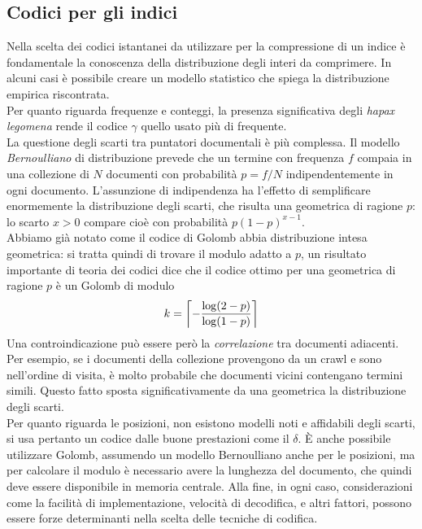 \subsection{Codici per gli indici}
Nella scelta dei codici istantanei da utilizzare per la compressione di un indice è fondamentale la conoscenza della distribuzione degli interi da comprimere. In alcuni casi è possibile creare un modello statistico che spiega la distribuzione empirica riscontrata.\\
Per quanto riguarda frequenze e conteggi, la presenza significativa degli \textit{hapax legomena} rende il codice $\gamma$ quello usato più di frequente.\\
La questione degli scarti tra puntatori documentali è più complessa. Il modello \textit{Bernoulliano} di distribuzione prevede che un termine con frequenza $f$ compaia in una collezione di $N$ documenti con probabilità $p = f / N$ indipendentemente in ogni documento. L'assunzione di indipendenza ha l'effetto di semplificare enormemente la distribuzione degli scarti, che risulta una geometrica di ragione $p$: lo scarto $x > 0$ compare cioè con probabilità $p(1 - p)^{x - 1}$.\\
Abbiamo già notato come il codice di Golomb abbia distribuzione intesa geometrica: si tratta quindi di trovare il modulo adatto a $p$, un risultato importante di teoria dei codici dice che il codice ottimo per una geometrica di ragione $p$ è un Golomb di modulo
\begin{equation}
    k = \left\lceil - \frac{\log(2 - p)}{\log(1 - p)} \right\rceil
\end{equation}
Una controindicazione può essere però la \textit{correlazione} tra documenti adiacenti. Per esempio, se i documenti della collezione provengono da un crawl e sono nell'ordine di visita, è molto probabile che documenti vicini contengano termini simili. Questo fatto sposta significativamente da una geometrica la distribuzione degli scarti.\\
Per quanto riguarda le posizioni, non esistono modelli noti e affidabili degli scarti, si usa pertanto un codice dalle buone prestazioni come il $\delta$. È anche possibile utilizzare Golomb, assumendo un modello Bernoulliano anche per le posizioni, ma per calcolare il modulo è necessario avere la lunghezza del documento, che quindi deve essere disponibile in memoria centrale. Alla fine, in ogni caso, considerazioni come la facilità di implementazione, velocità di decodifica, e altri fattori, possono essere forze determinanti nella scelta delle tecniche di codifica.
